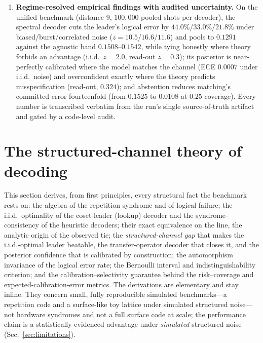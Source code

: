 \documentclass[reprint,aps,prxquantum,amsmath,amssymb,floatfix,nofootinbib,longbibliography]{revtex4-2}
\theoremstyle{definition}
\theoremstyle{remark}
\theoremstyle{plain}
\newcommand{\sync}[1]{#1}
\begin{document}
\begin{enumerate}[leftmargin=1.6em,itemsep=0.15em,topsep=0.25em]
    \item \textbf{Regime-resolved empirical findings with audited uncertainty.} On the unified benchmark (distance $\sync{9}$, $\sync{100{,}000}$ pooled shots per decoder), the spectral decoder cuts the leader's logical error by $\sync{44.0}\%$/$\sync{33.0}\%$/$\sync{21.8}\%$ under biased/burst/correlated noise ($z=\sync{10.5}$/$\sync{16.6}$/$\sync{11.6}$) and pools to $\sync{0.1291}$ against the agnostic band $\sync{0.1508}$--$\sync{0.1542}$, while tying honestly where theory forbids an advantage (i.i.d.\ $z=\sync{2.0}$, read-out $z=\sync{0.3}$); its posterior is near-perfectly calibrated where the model matches the channel (ECE $\sync{0.0007}$ under i.i.d.\ noise) and overconfident exactly where the theory predicts misspecification (read-out, $\sync{0.324}$); and abstention reduces matching's committed error fourteenfold (from $\sync{0.1525}$ to $\sync{0.0108}$ at $\sync{0.25}$ coverage). Every number is transcribed verbatim from the run's single source-of-truth artifact and gated by a code-level audit.
\end{enumerate}

\section{The structured-channel theory of decoding}
\label{sec:theory}

This section derives, from first principles, every structural fact the benchmark rests on: the algebra of the repetition syndrome and of logical failure; the i.i.d.\ optimality of the coset-leader (lookup) decoder and the syndrome-consistency of the heuristic decoders; their exact equivalence on the line, the analytic origin of the observed tie; the \emph{structured-channel gap} that makes the i.i.d.-optimal leader beatable, the transfer-operator decoder that closes it, and the posterior confidence that is calibrated by construction; the automorphism invariance of the logical error rate; the Bernoulli interval and indistinguishability criterion; and the calibration--selectivity guarantee behind the risk--coverage and expected-calibration-error metrics. The derivations are elementary and stay inline. They concern small, fully reproducible simulated benchmarks---a repetition code and a surface-like toy lattice under simulated structured noise---not hardware syndromes and not a full surface code at scale; the performance claim is a statistically evidenced advantage under \emph{simulated} structured noise (Sec.~\ref{sec:limitations}).
\end{document}
